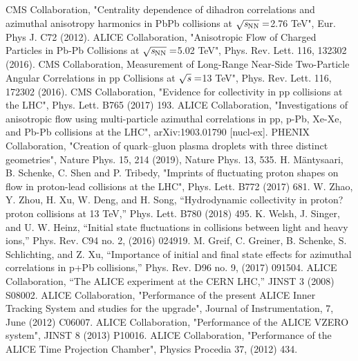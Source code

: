 \documentclass[ALICE,manyauthors]{cernphprep}
\begin{document}
\begin{thebibliography}{99}

CMS Collaboration, "Centrality dependence of dihadron correlations and azimuthal anisotropy harmonics in PbPb collisions at  $\sqrt{\it{s_{\rm{NN}}}} = $2.76 TeV",   Eur. Phys J. C72 (2012).
ALICE Collaboration, "Anisotropic Flow of Charged Particles in Pb-Pb Collisions at $\sqrt{\it{s_{\rm{NN}}}} = $5.02 TeV",  Phys. Rev. Lett. 116, 132302 (2016).
CMS Collaboration, Measurement of Long-Range Near-Side Two-Particle Angular Correlations in pp Collisions at $\sqrt{\it{s}} = $13 TeV", Phys. Rev. Lett. 116, 172302 (2016).
CMS Collaboration, "Evidence for collectivity in pp collisions at the LHC", Phys. Lett. B765 (2017) 193.
ALICE Collaboration, "Investigations of anisotropic flow using multi-particle azimuthal correlations in pp, p-Pb, Xe-Xe, and Pb-Pb collisions at the LHC", arXiv:1903.01790 [nucl-ex].
PHENIX Collaboration, "Creation of quark–gluon plasma droplets with three distinct geometries", Nature Phys. 15, 214 (2019), Nature Phys. 13, 535.
H. Mäntysaari, B. Schenke, C. Shen and P. Tribedy, "Imprints of fluctuating proton shapes on flow in proton-lead collisions at the LHC", Phys. Lett. B772 (2017) 681.
W. Zhao, Y. Zhou, H. Xu, W. Deng, and H. Song, “Hydrodynamic collectivity in proton?proton collisions at 13 TeV,” Phys. Lett. B780 (2018) 495.
K. Welsh, J. Singer, and U. W. Heinz, “Initial state fluctuations in collisions between light and heavy ions,” Phys. Rev. C94 no. 2, (2016) 024919.
M. Greif, C. Greiner, B. Schenke, S. Schlichting, and Z. Xu, “Importance of initial and final state effects for azimuthal correlations in p+Pb collisions,” Phys. Rev. D96 no. 9, (2017) 091504.
ALICE Collaboration, “The ALICE experiment at the CERN LHC,” JINST 3 (2008) S08002.
ALICE Collaboration, "Performance of the present ALICE Inner Tracking System and studies for the upgrade",  Journal of Instrumentation, 7, June (2012) C06007.
ALICE Collaboration, "Performance of the ALICE VZERO system", JINST 8 (2013) P10016.
ALICE Collaboration, "Performance of the ALICE Time Projection Chamber", Physics Procedia 37, (2012) 434.


\end{thebibliography}
\end{document}
